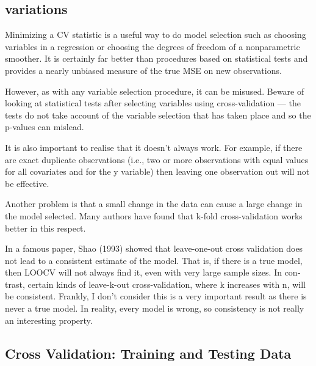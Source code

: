 \documentclass[a4paper,12pt]{article}
\begin{document}
\subsection{variations}

Min­i­miz­ing a CV sta­tis­tic is a use­ful way to do model selec­tion such as choos­ing vari­ables in a regres­sion or choos­ing the degrees of free­dom of a non­para­met­ric smoother. It is cer­tainly far bet­ter than pro­ce­dures based on sta­tis­ti­cal tests and pro­vides a nearly unbi­ased mea­sure of the true MSE on new observations.

How­ever, as with any vari­able selec­tion pro­ce­dure, it can be mis­used. Beware of look­ing at sta­tis­ti­cal tests after select­ing vari­ables using cross-​​validation — the tests do not take account of the vari­able selec­tion that has taken place and so the p-​​values can mislead.

It is also impor­tant to realise that it doesn’t always work. For exam­ple, if there are exact dupli­cate obser­va­tions (i.e., two or more obser­va­tions with equal val­ues for all covari­ates and for the y vari­able) then leav­ing one obser­va­tion out will not be effective.

Another prob­lem is that a small change in the data can cause a large change in the model selected. Many authors have found that k-​​fold cross-​​validation works bet­ter in this respect.

In a famous paper, Shao (1993) showed that leave-​​one-​​out cross val­i­da­tion does not lead to a con­sis­tent esti­mate of the model. That is, if there is a true model, then LOOCV will not always find it, even with very large sam­ple sizes. In con­trast, cer­tain kinds of leave-​​k-​​out cross-​​validation, where k increases with n, will be con­sis­tent. Frankly, I don’t con­sider this is a very impor­tant result as there is never a true model. In real­ity, every model is wrong, so con­sis­tency is not really an inter­est­ing property.

\newpage
\subsection{Cross Validation: Training and Testing Data}
\end{document}
